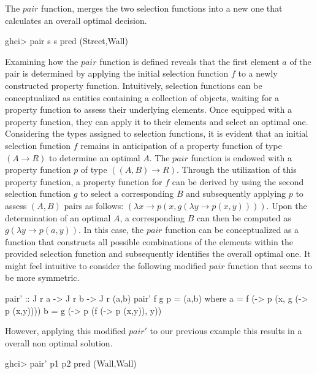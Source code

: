 \documentclass[runningheads]{llncs}
\begin{document}
The \(pair\) function, merges the two selection functions into a new one
that calculates an overall optimal decision.

\begin{haskell}
ghci> pair s s pred
(Street,Wall)
\end{haskell}

Examining how the \(pair\) function is defined reveals that the first
element \(a\) of the pair is determined by applying the initial
selection function \(f\) to a newly constructed property function.
Intuitively, selection functions can be conceptualized as entities
containing a collection of objects, waiting for a property function to
assess their underlying elements. Once equipped with a property
function, they can apply it to their elements and select an optimal one.
Considering the types assigned to selection functions, it is evident
that an initial selection function \(f\) remains in anticipation of a
property function of type \((A \rightarrow R)\) to determine an optimal
\(A\). The \(pair\) function is endowed with a property function \(p\)
of type \(((A,B) \rightarrow R)\). Through the utilization of this
property function, a property function for \(f\) can be derived by using
the second selection function \(g\) to select a corresponding \(B\) and
subsequently applying \(p\) to assess \((A,B)\) pairs as follows:
\((\lambda x \rightarrow p (x, g (\lambda y \rightarrow p (x,y))))\).
Upon the determination of an optimal \(A\), a corresponding \(B\) can
then be computed as \(g (\lambda y \rightarrow p (a,y))\). In this case,
the \(pair\) function can be conceptualized as a function that
constructs all possible combinations of the elements within the provided
selection function and subsequently identifies the overall optimal one.
It might feel intuitive to consider the following modified \(pair\)
function that seems to be more symmetric.

\begin{code}
pair' :: J r a -> J r b -> J r (a,b)
pair' f g p = (a,b)
  where
      a = f (\x -> p (x, g (\y -> p (x,y))))
      b = g (\y -> p (f (\x -> p (x,y)), y))
\end{code}

However, applying this modified \(pair'\) to our previous example this
results in a overall non optimal solution.

\begin{haskell}
ghci> pair' p1 p2 pred
(Wall,Wall)
\end{haskell}
\end{document}
